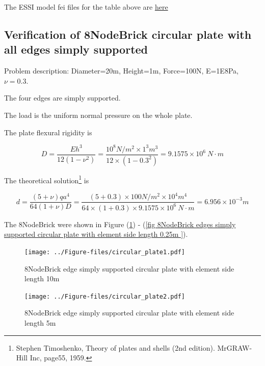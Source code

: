 \documentclass[fleqn,11pt]{article}
\begin{document}
The ESSI model fei files for the table above are \href{https://github.com/yuan-energy/ESSI_Verification/blob/master/8NodeBrick/circular_plate_clamped/circular_plate_clamped.tar.gz?raw=true}{here}






\newpage
\subsection{Verification of 8NodeBrick circular plate with all edges simply supported}


Problem description: Diameter=20m, Height=1m, Force=100N, E=1E8Pa, $\nu=0.3$. 

The four edges are simply supported. 

The load is the uniform normal pressure on the whole plate. 


The plate flexural rigidity is 

\begin{equation}
  D=\frac{Eh^3}{12(1-\nu^2)}=\frac{10^8 N/m^2 \times 1^3 m^3 }{12 \times (1-0.3^2) }= 9.1575 \times 10^6 \ N\cdot m
\end{equation}

The theoretical solution\footnote{Stephen Timoshenko, Theory of plates and shells (2nd edition). MrGRAW-Hill Inc, page55, 1959.} is 

\begin{equation}
  d= \frac{(5+\nu)  q a^4}{64(1+\nu) D}=\frac{(5+0.3)\times 100 N/m^2 \times 10^4 m^4}{64\times(1+0.3) \times 9.1575 \times 10^6 \ N\cdot m}=6.956\times 10^{-3} m
\end{equation}




The 8NodeBrick were shown in Figure (\ref{fig 8NodeBrick edges simply supported circular plate with element side length 10m }) - (\ref{fig 8NodeBrick edges simply supported circular plate with element side length 0.25m }). 



\begin{figure}[H]
  \centering
  \texttt{[image: ../Figure-files/circular\_plate1.pdf]}
  \caption{8NodeBrick edge simply supported circular plate with element side length 10m }
  \label{fig 8NodeBrick edges simply supported circular plate with element side length 10m }
\end{figure}

\newpage

\begin{figure}[H]
  \centering
  \texttt{[image: ../Figure-files/circular\_plate2.pdf]}
  \caption{8NodeBrick edge simply supported circular plate with element side length 5m }
  \label{fig 8NodeBrick edges simply supported circular plate with element side length 5m }
\end{figure}
\end{document}
